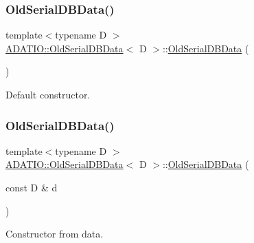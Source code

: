 \subsubsection{\texorpdfstring{OldSerialDBData()}{OldSerialDBData()}\hspace{0.1cm}{\footnotesize\ttfamily [1/4]}}
{\footnotesize\ttfamily template$<$typename D $>$ \\
\mbox{\hyperlink{classADATIO_1_1OldSerialDBData}{A\+D\+A\+T\+I\+O\+::\+Old\+Serial\+D\+B\+Data}}$<$ D $>$\+::\mbox{\hyperlink{classADATIO_1_1OldSerialDBData}{Old\+Serial\+D\+B\+Data}} (\begin{DoxyParamCaption}{ }\end{DoxyParamCaption})\hspace{0.3cm}{\ttfamily [inline]}}



Default constructor. 

\mbox{\label{classADATIO_1_1OldSerialDBData_ada293b92b5081fbb6e82364196ff5524}} 
\subsubsection{\texorpdfstring{OldSerialDBData()}{OldSerialDBData()}\hspace{0.1cm}{\footnotesize\ttfamily [2/4]}}
{\footnotesize\ttfamily template$<$typename D $>$ \\
\mbox{\hyperlink{classADATIO_1_1OldSerialDBData}{A\+D\+A\+T\+I\+O\+::\+Old\+Serial\+D\+B\+Data}}$<$ D $>$\+::\mbox{\hyperlink{classADATIO_1_1OldSerialDBData}{Old\+Serial\+D\+B\+Data}} (\begin{DoxyParamCaption}\item[{const D \&}]{d }\end{DoxyParamCaption})\hspace{0.3cm}{\ttfamily [inline]}}



Constructor from data. 

\mbox{\label{classADATIO_1_1OldSerialDBData_a189c0c4ac35db492b9cbc68deb15c5dd}} 
